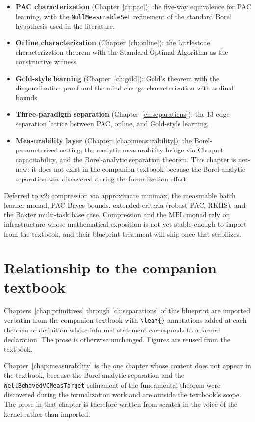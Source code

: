 \begin{itemize}[leftmargin=*,itemsep=3pt]
  \item \textbf{PAC characterization} (Chapter~\ref{ch:pac}): the
    five-way equivalence for PAC learning, with the
    \texttt{NullMeasurableSet} refinement of the standard Borel
    hypothesis used in the literature.
  \item \textbf{Online characterization} (Chapter~\ref{ch:online}):
    the Littlestone characterization theorem with the Standard Optimal
    Algorithm as the constructive witness.
  \item \textbf{Gold-style learning} (Chapter~\ref{ch:gold}): Gold's
    theorem with the diagonalization proof and the mind-change
    characterization with ordinal bounds.
  \item \textbf{Three-paradigm separation}
    (Chapter~\ref{ch:separations}): the 13-edge separation lattice
    between PAC, online, and Gold-style learning.
  \item \textbf{Measurability layer} (Chapter~\ref{chap:measurability}):
    the Borel-parameterized setting, the analytic measurability bridge
    via Choquet capacitability, and the Borel-analytic separation
    theorem. This chapter is net-new: it does not exist in the
    companion textbook because the Borel-analytic separation was
    discovered during the formalization effort.
\end{itemize}

Deferred to v2: compression via approximate minimax, the measurable
batch learner monad, PAC-Bayes bounds, extended criteria (robust PAC,
RKHS), and the Baxter multi-task base case. Compression and the MBL
monad rely on infrastructure whose mathematical exposition is not yet
stable enough to import from the textbook, and their blueprint
treatment will ship once that stabilizes.

\section*{Relationship to the companion textbook}

Chapters~\ref{chap:primitives} through \ref{ch:separations} of this
blueprint are imported verbatim from the companion textbook with
\texttt{\textbackslash lean\{\}} annotations added at each theorem or
definition whose informal statement corresponds to a formal
declaration. The prose is otherwise unchanged. Figures are reused from
the textbook.

Chapter~\ref{chap:measurability} is the one chapter whose content does
not appear in the textbook, because the Borel-analytic separation and
the \texttt{WellBehavedVCMeasTarget} refinement of the fundamental
theorem were discovered during the formalization work and are outside
the textbook's scope. The prose in that chapter is therefore written
from scratch in the voice of the kernel rather than imported.

